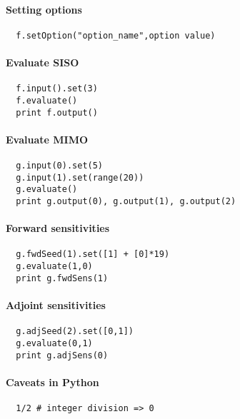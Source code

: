 \documentclass[a4paper,8pt,twocolumn]{article}
\begin{document}
\paragraph{Setting options}
\begin{verbatim}
  f.setOption("option_name",option value)
\end{verbatim}

\paragraph{Evaluate SISO}

\begin{verbatim}
  f.input().set(3)
  f.evaluate()
  print f.output()
\end{verbatim}

\paragraph{Evaluate MIMO}
\begin{verbatim}
  g.input(0).set(5)
  g.input(1).set(range(20))
  g.evaluate()
  print g.output(0), g.output(1), g.output(2)
\end{verbatim}

\paragraph{Forward sensitivities}

\begin{verbatim}
  g.fwdSeed(1).set([1] + [0]*19)
  g.evaluate(1,0)
  print g.fwdSens(1)
\end{verbatim}

\paragraph{Adjoint sensitivities}

\begin{verbatim}
  g.adjSeed(2).set([0,1])
  g.evaluate(0,1)
  print g.adjSens(0)
\end{verbatim}

\paragraph{Caveats in Python}
\begin{verbatim}
  1/2 # integer division => 0
\end{verbatim}
\end{document}

